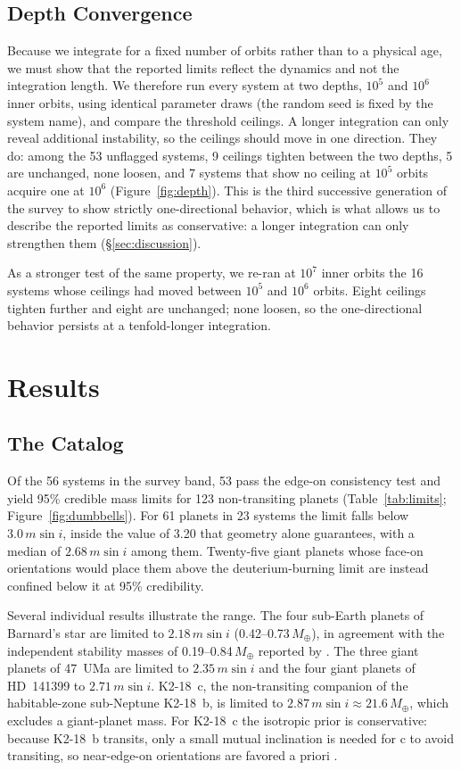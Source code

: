 \documentclass[twocolumn]{aastex631}
\newcommand{\msini}{m\sin i}
\newcommand{\mearth}{M_\oplus}
\begin{document}
\subsection{Depth Convergence} \label{sec:depth}

Because we integrate for a fixed number of orbits rather than to a
physical age, we must show that the reported limits reflect the dynamics
and not the integration length. We therefore run every system at two
depths, $10^5$ and $10^6$ inner orbits, using identical parameter draws
(the random seed is fixed by the system name), and compare the threshold
ceilings. A longer integration can only reveal additional instability, so
the ceilings should move in one direction. They do: among the 53 unflagged
systems, 9 ceilings tighten between the two depths, 5 are unchanged, none
loosen, and 7 systems that show no ceiling at $10^5$ orbits acquire one at
$10^6$ (Figure~\ref{fig:depth}). This is the third successive generation
of the survey to show strictly one-directional behavior, which is what
allows us to describe the reported limits as conservative: a longer
integration can only strengthen them (\S\ref{sec:discussion}).

As a stronger test of the same property, we re-ran at $10^7$ inner orbits
the 16 systems whose ceilings had moved between $10^5$ and $10^6$ orbits.
Eight ceilings tighten further and eight are unchanged; none loosen, so
the one-directional behavior persists at a tenfold-longer integration.

\section{Results} \label{sec:results}

\subsection{The Catalog} \label{sec:catalog}

Of the 56 systems in the survey band, 53 pass the edge-on consistency test
and yield 95\% credible mass limits for 123 non-transiting planets
(Table~\ref{tab:limits}; Figure~\ref{fig:dumbbells}). For 61 planets in 23
systems the limit falls below $3.0\,\msini$, inside the value of 3.20 that
geometry alone guarantees, with a median of $2.68\,\msini$ among them.
Twenty-five giant planets whose face-on orientations would place them
above the deuterium-burning limit are instead confined below it at 95\%
credibility.

Several individual results illustrate the range. The four sub-Earth
planets of Barnard's star are limited to $2.18\,\msini$
(0.42--0.73\,$\mearth$), in agreement with the independent stability
masses of 0.19--0.84\,$\mearth$ reported by \citet{Byrne2026}. The three
giant planets of 47~UMa are limited to $2.35\,\msini$ and the four giant
planets of HD~141399 to $2.71\,\msini$. K2-18~c, the non-transiting
companion of the habitable-zone sub-Neptune K2-18~b, is limited to
$2.87\,\msini \approx 21.6\,\mearth$, which excludes a giant-planet mass.
For K2-18~c the isotropic prior is conservative: because K2-18~b transits,
only a small mutual inclination is needed for c to avoid transiting, so
near-edge-on orientations are favored a priori \citep{Cloutier2017}.
\end{document}

